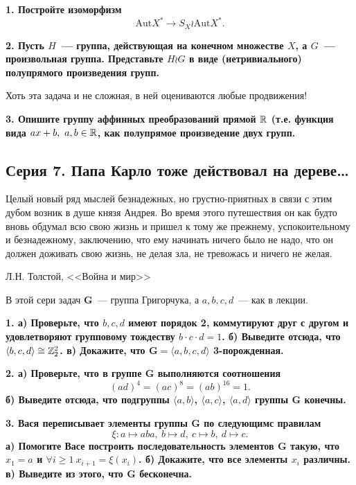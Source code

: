\documentclass[12pt, oneside, dvipsnames]{extarticle}
\begin{document}
	\bf{1.} Постройте изоморфизм 
	\[
		\mathrm{Aut}{X^*} \to S_{X} \wr \mathrm{Aut}{X^*}. 
	\]

	\bf{2.} Пусть $H$~--- группа, действующая на конечном множестве $X$, а $G$~--- произвольная группа. Представьте $H \wr G$ в виде (нетривиального) полупрямого произведения групп. 

	 Хоть эта задача и не сложная, в ней оцениваются любые продвижения! 

	 \bf{3.} Опишите группу аффинных преобразований прямой $\mathbb{R}$ (т.е. функция вида $ax + b, \ a, b \in \mathbb{R}$, как полупрямое произведение двух групп. 

	 \begin{center}
	 \subsection*{Серия 7. Папа Карло тоже действовал на дереве\ldots }
	 \end{center}

	\epigraph{Целый новый ряд мыслей безнадежных, но грустно-приятных в связи с этим дубом возник в душе князя Андрея. Во время этого путешествия он как будто вновь обдумал всю свою жизнь и пришел к тому же прежнему, успокоительному и безнадежному, заключению, что ему начинать ничего было не надо, что он должен доживать свою жизнь, не делая зла, не тревожась и ничего не желая.}{Л.Н. Толстой, <<Война и мир>>}

	В этой сери задач $\mathbf{G}$~--- группа Григорчука, а $a, b, c, d$~--- как в лекции. 

	\bf{1.} а) Проверьте, что $b, c, d$ имеют порядок 2, коммутируют друг с другом и удовлетворяют групповому тождеству  $b \cdot c \cdot d = 1$. б) Выведите отсюда, что $\langle b, c, d \rangle \cong \mathbb{Z}_{2}^2$. в) Докажите, что $\mathbf{G} = \langle a, b, c, d \rangle$ 3-порожденная. 
	
	\bf{2.} а) Проверьте, что в группе $\mathbf{G}$ выполняются соотношения 
	\[
		(ad)^4 = (ac)^8 = (ab)^{16} = 1.
	\]
	б) Выведите отсюда, что подгруппы $\langle a, b \rangle$, $\langle a, c \rangle$, $\langle a, d \rangle$ группы $\mathbf{G}$ конечны. 

	\bf{3.} Вася переписывает элементы группы $\mathbf{G}$ по следующимс правилам
	\[
		\xi\colon a \mapsto aba, \ b \mapsto d, \ c \mapsto b, \ d \mapsto c.
	\]
	а) Помогите Васе построить последовательность элементов $\mathbf{G}$ такую, что $x_1 = a$ и $\forall i \ge 1 \ x_{i + 1} = \xi(x_{i})$. б) Докажите, что все элементы $x_i$ различны. в) Выведите из этого, что  $\mathbf{G}$ бесконечна.
\end{document}
